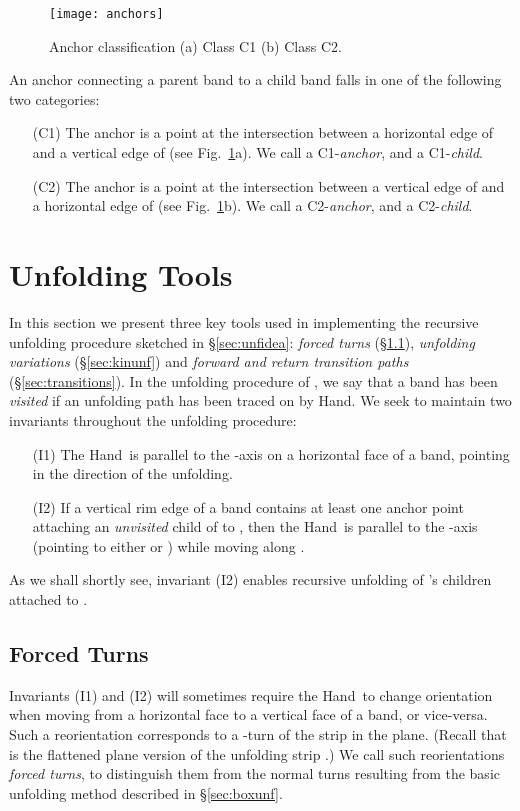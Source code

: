 \documentclass[11pt]{article}
\newcommand\hand{{\sc Hand}}
\begin{document}
\begin{figure}[htbp]
\centering
\texttt{[image: anchors]}
\caption{Anchor classification (a) Class C1 (b) Class C2.}
\label{fig:anchors}
\end{figure}


\noindent
An anchor connecting a parent band  to a child band  falls in one of the following two categories:
\begin{itemize}
\item [(C1)] The anchor is a point  at the intersection between a horizontal edge of  and a vertical edge of  
(see Fig.~\ref{fig:anchors}a). We call  a C1-\emph{anchor}, and  a C1-\emph{child}. 
\item [(C2)] The anchor is a point  at the intersection between a vertical edge of  and a horizontal edge of 
(see Fig.~\ref{fig:anchors}b). We call  a C2-\emph{anchor}, and  a C2-\emph{child}. 
\end{itemize}

\section{Unfolding Tools}
In this section we present three key tools used in implementing the recursive unfolding procedure sketched in \S\ref{sec:unfidea}: \emph{forced turns} (\S\ref{sec:forcedturns}), \emph{unfolding variations} (\S\ref{sec:kinunf}) and \emph{forward and return transition paths} (\S\ref{sec:transitions}).
In the unfolding procedure of , we say that a band  has been \emph{visited} if an unfolding path has been traced on  by \hand. We seek to maintain two invariants throughout the unfolding procedure:
\begin{enumerate}
\item [(I1)] The \hand\ is parallel to the -axis on a horizontal face of a band, pointing in the direction of the unfolding.
\item [(I2)] If a vertical rim edge  of a band  contains at least one anchor point attaching an \emph{unvisited} child of  to , then the \hand\ is parallel to the -axis (pointing to either  or ) while moving along .
\end{enumerate}
As we shall shortly see, invariant (I2) enables recursive unfolding of 's children attached to .

\subsection{Forced Turns}
\label{sec:forcedturns}
Invariants (I1) and (I2) will sometimes require the \hand\ to change orientation when moving from a horizontal face to a vertical face of a band, or vice-versa. Such a reorientation corresponds to a -turn of the strip  in the plane. (Recall that  is the flattened plane version of the unfolding strip .) We call such reorientations \emph{forced turns}, to distinguish them from the normal turns resulting from the basic unfolding method described in \S\ref{sec:boxunf}.
\end{document}
